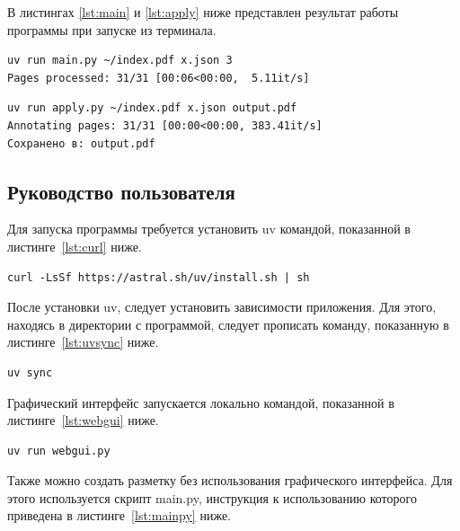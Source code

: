 \newpage

В листингах \ref{lst:main} и \ref{lst:apply} ниже представлен результат работы программы при запуске из терминала.

\begin{lstlisting}[caption={Запуск и результат работы разметки из терминала}, label={lst:main}]
uv run main.py ~/index.pdf x.json 3
Pages processed: 31/31 [00:06<00:00,  5.11it/s]
\end{lstlisting}

\begin{lstlisting}[caption={Запуск и результат применения разметки к PDF из терминала}, label={lst:apply}]
uv run apply.py ~/index.pdf x.json output.pdf
Annotating pages: 31/31 [00:00<00:00, 383.41it/s]
Сохранено в: output.pdf
\end{lstlisting}

\subsection{Руководство пользователя}

Для запуска программы требуется установить uv командой, показанной в листинге~\ref{lst:curl} ниже.
\begin{lstlisting}[caption={Установка uv}, label={lst:curl}]
curl -LsSf https://astral.sh/uv/install.sh | sh
\end{lstlisting}

После установки uv, следует установить зависимости приложения.
Для этого, находясь в директории с программой, следует прописать команду, показанную в листинге~\ref{lst:uvsync} ниже.
\begin{lstlisting}[caption={Установка зависимостей}, label={lst:uvsync}]
uv sync
\end{lstlisting}

Графический интерфейс запускается локально командой, показанной в листинге~\ref{lst:webgui} ниже.
\begin{lstlisting}[caption={Запуск графического веб-интерфейса}, label={lst:webgui}]
uv run webgui.py
\end{lstlisting}

Также можно создать разметку без использования графического интерфейса.
Для этого используется скрипт main.py, инструкция к использованию которого приведена в листинге~\ref{lst:mainpy} ниже.

\newpage

